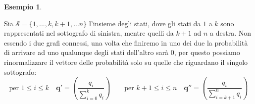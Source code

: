 \documentclass{article}
\theoremstyle{definition}
\newtheorem{example}[theorem]{Esempio}
\theoremstyle{remark}
\begin{document}
\begin{example}
\begin{center}

    \end{center}
    Sia $\mathcal{S}=\{1,...,k,k+1,...n\}$
    l'insieme degli stati, dove gli stati da $1$ a $k$ sono rappresentati nel sottografo di sinistra, mentre quelli da $k+1$ ad $n$ a destra.
    Non essendo  i due grafi connessi, una volta che finiremo in uno dei due la probabilità di arrivare ad uno
    qualunque degli stati dell'altro sarà $0$, per questo possiamo rinormalizzare il vettore delle probabilità solo su quelle che riguardano il singolo
    sottografo:
    $$\text{per $1\le i\le k$}\quad \mathbf{q'}=\left(\frac{q_i}{\sum_{i=0}^k q_i}\right) \qquad \text{per $k+1\le i\le n$}\quad \mathbf{q''}=\left(\frac{q_i}{\sum_{i=k+1}^n q_i}\right)$$
\end{example}
\end{document}

